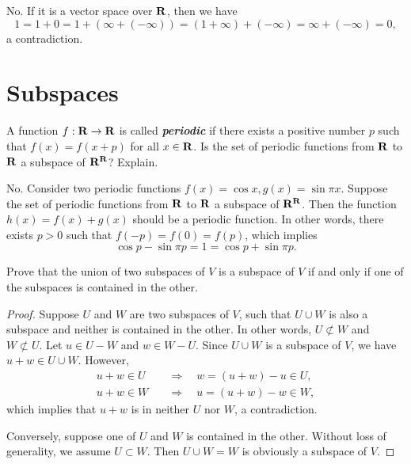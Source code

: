 \begin{solution}
	No. If it is a vector space over \( \mathbf{R} \), then we have
	\[
		1 = 1 + 0 = 1 + (\infty + (-\infty)) = (1 + \infty) + (-\infty) = \infty + (-\infty) = 0,
	\]
	a contradiction.
\end{solution}



\section{Subspaces}

\begin{exercise}{9}
A function \( f: \mathbf{R} \to \mathbf{R} \) is called \textbf{\textit{periodic}} if there exists a positive number \( p \) such that \( f(x) = f(x + p) \) for all \( x \in \mathbf{R} \). Is the set of periodic functions from \( \mathbf{R} \) to \( \mathbf{R} \) a subspace of \( \mathbf{R}^{\mathbf{R}} \)? Explain.
\end{exercise}

\begin{solution}
	No. Consider two periodic functions \( f(x) = \cos x, g(x) = \sin\pi x \). Suppose the set of periodic functions from \( \mathbf{R} \) to \( \mathbf{R} \) a subspace of \( \mathbf{R}^{\mathbf{R}} \). Then the function \( h(x) = f(x) + g(x) \) should be a periodic function. In other words, there exists \( p > 0 \) such that \( f(-p) = f(0) = f(p) \), which implies
	\[
		\cos p - \sin\pi p = 1 = \cos p + \sin\pi p.
	\]
\end{solution}

\begin{exercise}{12}
	Prove that the union of two subspaces of \( V \) is a subspace of \( V \) if and only if one of the subspaces is contained in the other.
\end{exercise}

\begin{proof}
	Suppose \( U \) and \( W \) are two subspaces of \( V \), such that \( U \cup W \) is also a subspace and neither is contained in the other. In other words, \( U \not\subset W \) and \( W \not\subset U \). Let \( u \in U - W \) and \( w \in W - U \). Since \( U \cup W \) is a subspace of \( V \), we have \( u + w \in U \cup W \). However,
	\begin{align*}
		u + w \in U \quad &\Rightarrow \quad w = (u + w) - u \in U, \\
		u + w \in W \quad &\Rightarrow \quad u = (u + w) - w \in W,
	\end{align*}
	which implies that \( u + w \) is in neither \( U \) nor \( W \), a contradiction.

	Conversely, suppose one of \( U \) and \( W \) is contained in the other. Without loss of generality, we assume \( U \subset W \). Then \( U \cup W = W \) is obviously a subspace of \( V \).
\end{proof}

